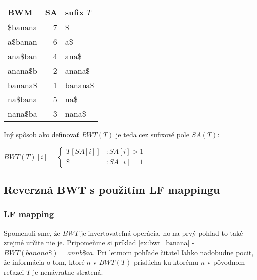     \bigskip
    
    \begin{example}
        \begin{tabular}{ | l  | r | l | }
            \hline
            \textbf{BWM} & \textbf{SA} & \textbf{sufix $T$} \\ \hline 
            \$banana     & 7           & \$                 \\ \hline
            a\$banan     & 6           & a\$                \\ \hline
            ana\$ban     & 4           & ana\$              \\ \hline
            anana\$b     & 2           & anana\$            \\ \hline
            banana\$     & 1           & banana\$           \\ \hline
            na\$bana     & 5           & na\$               \\ \hline
            nana\$ba     & 3           & nana\$             \\ \hline
        \end{tabular}
    \end{example}
    
    \bigskip
    
    Iný spôsob ako definovať $BWT(T)$ je teda cez sufixové pole $SA(T)$:
    
    \bigskip
    
    $
        BWT(T)[i] = \begin{cases}
                        T[SA[i]] & : SA[i] > 1 \\ 
                        \$       & : SA[i] = 1
                    \end{cases}
    $                    
     
    \subsection{Reverzná BWT s použitím LF mappingu}
    \subsubsection{LF mapping}
    Spomenuli sme, že $BWT$ je invertovateľná operácia, no na prvý pohľad to také zrejmé určite nie je. Pripomeňme si príklad \ref{ex:bwt_banana} - $BWT(banana\$) = annb\$aa$. Pri letmom pohľade čitateľ ľahko nadobudne pocit, že informácia o tom, ktoré $n$ v $BWT(T)$ prislúcha ku ktorému $n$ v pôvodnom reťazci $T$ je nenávratne stratená.
    
